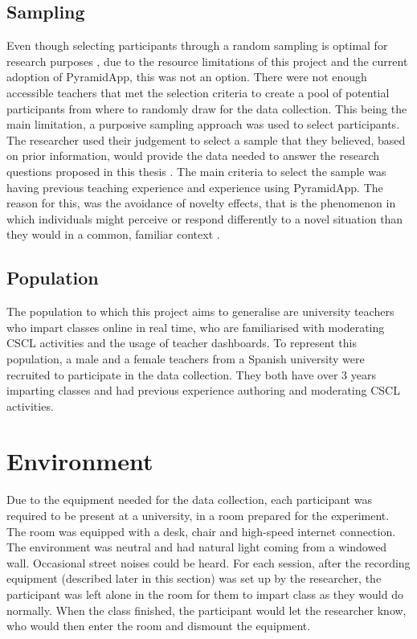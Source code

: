 \subsection{Sampling}
Even though selecting participants through a random sampling is optimal for research purposes \cite{fraenkel_wallen_hyun_2019}, due to the resource limitations of this project and the current adoption of PyramidApp, this was not an option. There were not enough accessible teachers that met the selection criteria to create a pool of potential participants from where to randomly draw for the data collection. This being the main limitation, a purposive sampling approach was used to select participants. The researcher used their judgement to select a sample that they believed, based on prior information, would provide the data needed to answer the research questions proposed in this thesis \cite{fraenkel_wallen_hyun_2019}. The main criteria to select the sample was having previous teaching experience and experience using PyramidApp. The reason for this, was the avoidance of novelty effects, that is the phenomenon in which individuals might perceive or respond differently to a novel situation than they would in a common, familiar context \cite{gravetter_2016}.
\subsection{Population}
The population to which this project aims to generalise are university teachers who impart classes online in real time, who are familiarised with moderating CSCL activities and the usage of teacher dashboards.
To represent this population, a male and a female teachers from a Spanish university were recruited to participate in the data collection. They both have over 3 years imparting classes and had previous experience authoring and moderating CSCL activities. 
\section{Environment}
Due to the equipment needed for the data collection, each participant was required to be present at a university, in a room prepared for the experiment. The room was equipped with a desk, chair and high-speed internet connection. The environment was neutral and had natural light coming from a windowed wall. Occasional street noises could be heard.
For each session, after the recording equipment (described later in this section) was set up by the researcher, the participant was left alone in the room for them to impart class as they would do normally. When the class finished, the participant would let the researcher know, who would then enter the room and dismount the equipment.
